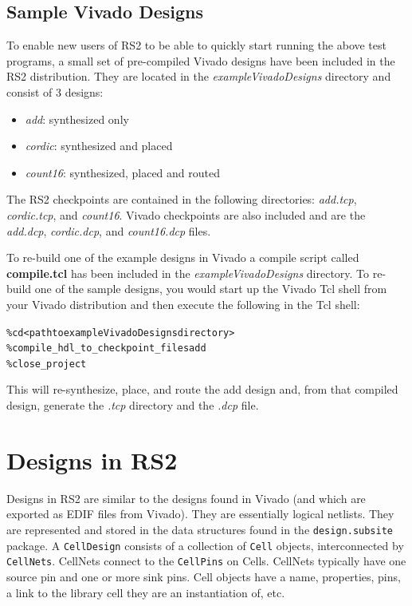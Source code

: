 \documentclass[12pt]{article}
\newcommand{\fil}[1]{{\em #1}}
\newcommand{\cls}[1]{{\texttt{#1}}}
\newcommand{\pkg}[1]{{\texttt{#1}}}
\newcommand{\pgm}[1]{{\textbf{#1}}}
\newcommand{\dir}[1]{{\em #1}}
\newcommand{\sbr}[1]{{\em #1}}
\newenvironment{code}{\begin{center} \begin{minipage}{6in} \noindent \begin{alltt}}{\end{alltt} \end{minipage} \end{center}}
\begin{document}
\subsection{Sample Vivado Designs}
To enable new users of RS2 to be able to quickly start running the above test
programs, a small set of pre-compiled Vivado designs have been included in the
RS2 distribution.  They are located in the \dir{exampleVivadoDesigns} directory
and consist of 3 designs: 
\begin{itemize}
\item \sbr{add}: synthesized only
\item \sbr{cordic}: synthesized and placed
\item \sbr{count16}: synthesized, placed and routed
\end{itemize} 
The RS2 checkpoints are contained in
the following directories: \dir{add.tcp}, \dir{cordic.tcp}, and
\dir{count16}.
Vivado checkpoints are also included and are the \fil{add.dcp},
\fil{cordic.dcp}, and \fil{count16.dcp} files.  

To re-build one of the example designs in Vivado a compile script called
\pgm{compile.tcl} has been included in the \dir{exampleVivadoDesigns}
directory.  To re-build one of the sample designs, you would start up the Vivado
Tcl shell from your Vivado distribution and then execute the following in the Tcl shell:                
\vspace{-0.15in}  \begin{code}
	\% cd <path to exampleVivadoDesigns directory>
	\% compile_hdl_to_checkpoint_files add
	\% close_project
\end{code}
This will re-synthesize, place, and route the add design and, from that compiled
design, generate the \dir{.tcp} directory and the \fil{.dcp} file.

\section{Designs in RS2}

Designs in RS2 are similar to the designs found in Vivado (and which are
exported as EDIF files from Vivado). 
They are essentially logical netlists.  They are represented and stored in the
data structures found in the \pkg{design.subsite} package.  A \cls{CellDesign}
consists of a collection of \cls{Cell} objects, interconnected by
\cls{CellNets}.
CellNets connect to the \cls{CellPins} on Cells.  CellNets typically have one
source pin and one or more sink pins.  Cell objects have a name, properties, pins, a link to the library cell
they are an instantiation of, etc.
\end{document}
